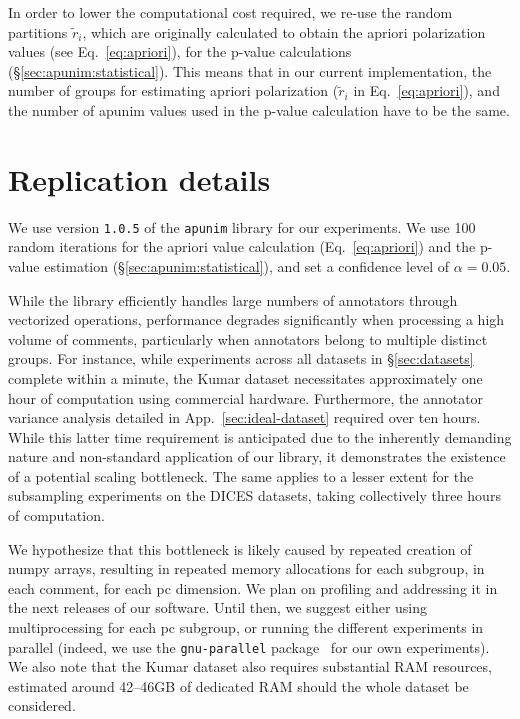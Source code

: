 \documentclass{article} %
\theoremstyle{definition}
\theoremstyle{plain}
\begin{document}
In order to lower the computational cost required, we re-use the random partitions $\tilde{r}_i$, which are originally calculated to obtain the apriori polarization values (see Eq.~\ref{eq:apriori}), for the p-value calculations (\S\ref{sec:apunim:statistical}). This means that in our current implementation, the number of groups for estimating apriori polarization ($\tilde{r}_i$ in Eq.~\ref{eq:apriori}), and the number of apunim values used in the p-value calculation have to be the same.


\section{Replication details}
\label{app:replication}

We use version \texttt{1.0.5} of the \texttt{apunim} library for our experiments. We use 100 random iterations for the apriori value calculation (Eq.~\ref{eq:apriori}) and the p-value estimation (\S\ref{sec:apunim:statistical}), and set a confidence level of $\alpha=0.05$.

While the library efficiently handles large numbers of annotators through vectorized operations, performance degrades significantly when processing a high volume of comments, particularly when annotators belong to multiple distinct groups. For instance, while experiments across all datasets in \S\ref{sec:datasets} complete within a minute, the Kumar dataset necessitates approximately one hour of computation using commercial hardware. Furthermore, the annotator variance analysis detailed in App.~\ref{sec:ideal-dataset} required over ten hours. While this latter time requirement is anticipated due to the inherently demanding nature and non-standard application of our library, it demonstrates the existence of a potential scaling bottleneck. The same applies to a lesser extent for the subsampling experiments on the DICES datasets, taking collectively three hours of computation.

We hypothesize that this bottleneck is likely caused by repeated creation of numpy arrays, resulting in repeated memory allocations for each subgroup, in each comment, for each \ac{pc} dimension. We plan on profiling and addressing it in the next releases of our software. Until then, we suggest either using multiprocessing for each \ac{pc} subgroup, or running the different experiments in parallel (indeed, we use the \texttt{gnu-parallel} package~\cite{tange_2025_16944306} for our own experiments). We also note that the Kumar dataset also requires substantial RAM resources, estimated around 42--46GB of dedicated RAM should the whole dataset be considered.
\end{document}
